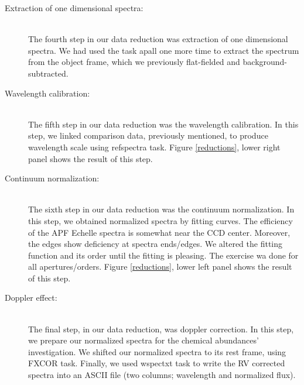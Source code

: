 \begin{description}
\item[Extraction of one dimensional spectra:] \hfill \\ The fourth step in our data reduction was extraction of one dimensional spectra. We had used the task apall one more time to extract the spectrum from the object frame, which we previously flat-fielded and background-subtracted.

\item[Wavelength calibration:] \hfill \\ The fifth step in our data reduction was the wavelength calibration. In this step, we linked comparison data, previously mentioned, to produce wavelength scale using refspectra task. Figure \ref{reductions}, lower right panel shows the result of this step.

\item[Continuum normalization:] \hfill \\ The sixth step in our data reduction was the continuum normalization. In this step, we obtained normalized spectra by fitting curves. The efficiency of the APF Echelle spectra is somewhat near the CCD center. Moreover, the edges show deficiency at spectra ends/edges. We altered the fitting function and its order until the fitting is pleasing. The exercise wa done for all apertures/orders. Figure \ref{reductions}, lower left panel shows the result of this step.

\item[Doppler effect:] \hfill \\ The final step, in our data reduction, was doppler correction. In this step, we prepare our normalized spectra for the chemical abundances' investigation. We shifted our normalized spectra to its rest frame, using FXCOR task. Finally, we used wspectxt task to write the RV corrected spectra into an ASCII file (two columns; wavelength and normalized flux).

\end{description}







